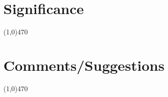 \documentclass[12pt]{article}
\begin{document}



	\newpage
\section{Significance} \vspace{-.7cm} \line(1,0){470}
	\paragraph{}


 \section{Comments/Suggestions}\vspace{-.7cm} \line(1,0){470}
 	\paragraph{}
		
\end{document}
